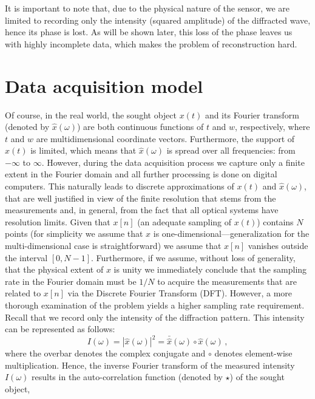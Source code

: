 It is important to note that, due to the physical nature of the
sensor, we are limited to recording only the intensity (squared
amplitude) of the diffracted wave, hence its phase is lost. As will
be shown later, this loss of the phase leaves us with highly incomplete
data, which makes the problem of reconstruction hard.



\section{Data acquisition model}
\label{sec:data-acqu-model}
Of course, in the real world, the sought object $x(t)$ and its Fourier
transform (denoted by $\hat{x}(\omega)$) are both continuous functions
of $t$ and $w$, respectively, where $t$ and $w$ are multidimensional
coordinate vectors. Furthermore, the support of $x(t)$ is limited,
which means that $\hat{x}(\omega)$ is spread over all frequencies:
from $-\infty$ to $\infty$.  However, during the data acquisition
process we capture only a finite extent in the Fourier domain and all
further processing is done on digital computers. This naturally leads
to discrete approximations of $x(t)$ and $\hat{x}(\omega)$, that are
well justified in  view of the finite resolution that stems from
the measurements and, in general, from the fact that all optical
systems have resolution limits. Given that $x[n]$ (an adequate
sampling of $x(t)$) contains $N$ points (for simplicity we assume that
$x$ is one-dimensional---generalization for the multi-dimensional case
is straightforward) we assume that $x[n]$ vanishes outside the interval
$[0,N-1]$. Furthermore, if we assume, without loss of generality, that
the physical extent of $x$ is unity we immediately conclude that the
sampling rate in the Fourier domain must be $1/N$ to acquire the
measurements that are related to $x[n]$ via the Discrete Fourier
Transform (DFT). However, a more thorough examination of the problem
yields a higher sampling rate requirement. Recall that we record only
the intensity of the diffraction pattern. This intensity can be
represented as follows:
\begin{equation}
  \label{eq:intro-1}
  I(\omega) =
  |\hat{x}(\omega)|^{2}=\bar{\hat{x}}(\omega)\circ\hat{x}(\omega)\,, 
\end{equation}
where the overbar denotes the complex conjugate and $\circ$ denotes
element-wise multiplication. Hence, the inverse Fourier transform of
the measured intensity $I(\omega)$ results in the auto-correlation
function (denoted by $\star$) of the sought object,
